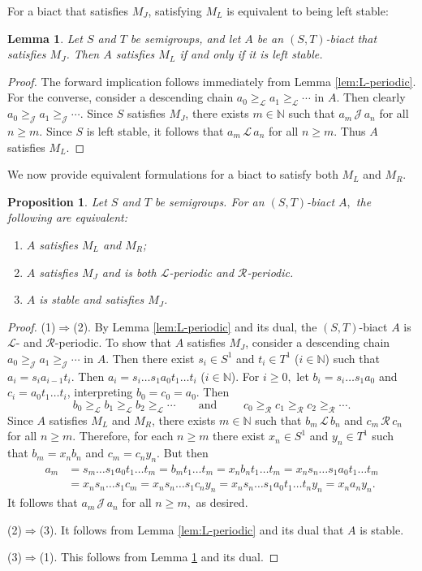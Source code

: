\documentclass[twoside,a4paper,12pt,reqno]{amsart}
\theoremstyle{plain}
\newtheorem{lem}[thm]{Lemma}
\newtheorem{prop}[thm]{Proposition}
\theoremstyle{definition}
\renewcommand{\l}{\mbox{${\mathcal{L}}$}}
\renewcommand{\r}{\mbox{${\mathcal{R}}$}}
\renewcommand{\j}{\mbox{${\mathcal{J}}$}}
\newcommand{\geql}{\geq_{\mathcal{L}}}
\newcommand{\geqr}{\geq_{\mathcal{R}}}
\newcommand{\geqj}{\geq_{\mathcal{J}}}
\newcommand{\N}{\mathbb{N}}
\begin{document}
For a biact that satisfies $M_J$, satisfying $M_L$ is equivalent to being left stable:

\begin{lem}\label{lem:M_J,M_L}
Let $S$ and $T$ be semigroups, and let $A$ be an $(S,T)$-biact that satisfies $M_J$.  Then $A$ satisfies $M_L$ if and only if it is left stable.
\end{lem}

\begin{proof}
The forward implication follows immediately from Lemma \ref{lem:L-periodic}.  For the converse, consider a descending chain $a_0\geql a_1\geql\cdots$ in $A.$  Then clearly $a_0\geqj a_1\geqj\cdots$.  Since $S$ satisfies $M_J$, there exists $m\in\N$ such that $a_m\,\j\,a_n$ for all $n\geq m.$  Since $S$ is left stable, it follows that $a_m\,\l\,a_n$ for all $n\geq m.$  Thus $A$ satisfies $M_L$.
\end{proof}

We now provide equivalent formulations for a biact to satisfy both $M_L$ and $M_R$.

\begin{prop}\label{prop:M_L+M_R}
Let $S$ and $T$ be semigroups.  For an $(S,T)$-biact $A,$ the following are equivalent:
\begin{enumerate}[leftmargin=*]
\item[\emph{(1)}] $A$ satisfies $M_L$ and $M_R$;
\item[\emph{(2)}] $A$ satisfies $M_J$ and is both $\l$-periodic and $\r$-periodic.
\item[\emph{(3)}] $A$ is stable and satisfies $M_J$.
\end{enumerate}
\end{prop}

\begin{proof}
(1)$\Rightarrow$(2).  By Lemma \ref{lem:L-periodic} and its dual, the $(S,T)$-biact $A$ is $\l$- and $\r$-periodic.  To show that $A$ satisfies $M_J$, consider a descending chain $a_0\geqj a_1\geqj\cdots$ in $A.$  Then there exist $s_i\in S^1$ and $t_i\in T^1$ ($i\in\N$) such that $a_i=s_ia_{i-1}t_i$.  Then $a_i=s_i\dots s_1a_0t_1\dots t_i$ ($i\in\N$).  For $i\geq0,$ let $b_i=s_i\dots s_1a_0$ and $c_i=a_0t_1\dots t_i$, interpreting $b_0=c_0=a_0$.  Then
$$b_0\geql b_1\geql b_2\geql\cdots\qquad\text{and }\qquad c_0\geqr c_1\geqr c_2\geqr\cdots.$$
Since $A$ satisfies $M_L$ and $M_R$, there exists $m\in\N$ such that $b_m\,\l\,b_n$ and $c_m\,\r\,c_n$ for all $n\geq m.$  Therefore, for each $n\geq m$ there exist $x_n\in S^1$ and $y_n\in T^1$ such that $b_m=x_nb_n$ and $c_m=c_ny_n$.  But then 
\begin{align*}
a_m&=s_m\dots s_1a_0t_1\dots t_m=b_mt_1\dots t_m=x_nb_nt_1\dots t_m=x_ns_n\dots s_1a_0t_1\dots t_m\\
&=x_ns_n\dots s_1c_m=x_ns_n\dots s_1c_ny_n=x_ns_n\dots s_1a_0t_1\dots t_ny_n=x_na_ny_n.
\end{align*}
It follows that $a_m\,\j\,a_n$ for all $n\geq m,$ as desired.

(2)$\Rightarrow$(3).  It follows from Lemma \ref{lem:L-periodic} and its dual that $A$ is stable.

(3)$\Rightarrow$(1).  This follows from Lemma \ref{lem:M_J,M_L} and its dual.
\end{proof} 
\end{document}
